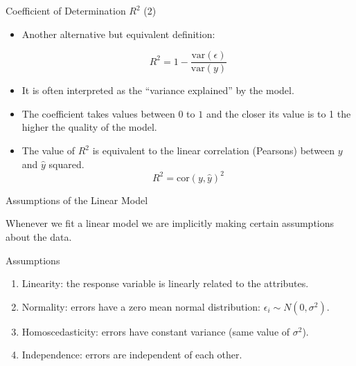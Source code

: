 \documentclass[handout]{beamer}
\begin{document}
\begin{frame}{Coefficient of Determination $R^2$ (2)}
\scriptsize{
\begin{itemize}
 
 \item Another alternative but equivalent definition:
 
   \begin{equation}
  R^2= 1-\frac{\text{var}(\epsilon)}{\text{var}(y)} 
 \end{equation}

 \item It is often interpreted as the ``variance explained'' by the model.
 
 \item The coefficient takes values between $0$ to $1$ and the closer its value is to 1 the higher the quality of the model.
 
 \item The value of $R^2$ is equivalent to the linear correlation (Pearsons) between $y$ and $\hat{y}$ squared.
\begin{displaymath}
 R^2=\text{cor}(y,\hat{y})^2
\end{displaymath}
  
\end{itemize}


}
\end{frame}



\begin{frame}{Assumptions of the Linear Model}
\scriptsize{





Whenever we fit a linear model we are implicitly making certain assumptions about the data.  


\begin{block}{Assumptions}
\begin{enumerate}
\item Linearity: the response variable is linearly related to the attributes. 
\item  Normality: errors have a zero mean normal distribution: $\epsilon_{i} \sim N(0,\sigma^2)$.
\item Homoscedasticity: errors have constant variance (same value of $\sigma^2$).
\item Independence: errors are independent of each other.
 
\end{enumerate}
 
\end{block}

} 
\end{frame}
\end{document}
